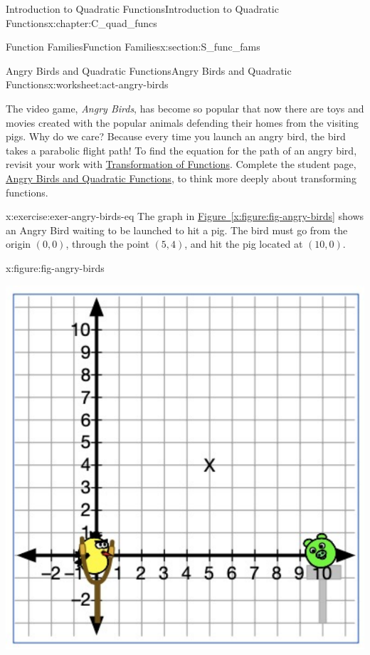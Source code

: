 \documentclass[oneside,10pt,]{book}
\newcommand{\xreffont}{\relax}
\newcommand{\pubtitle}[1]{\textsl{#1}}
\numberwithin{equation}{chapter}
\begin{document}
\begin{chapterptx}{Introduction to Quadratic Functions}{}{Introduction to Quadratic Functions}{}{}{x:chapter:C_quad_funcs}
\begin{sectionptx}{Function Families}{}{Function Families}{}{}{x:section:S_func_fams}
\begin{worksheet-subsection}{Angry Birds and Quadratic Functions}{}{Angry Birds and Quadratic Functions}{}{}{x:worksheet:act-angry-birds}
\begin{introduction}{}%
The video game, \pubtitle{Angry Birds}, has become so popular that now there are toys and movies created with the popular animals defending their homes from the visiting pigs. Why do we care? Because every time you launch an angry bird, the bird takes a parabolic flight path! To find the equation for the path of an angry bird, revisit your work with \hyperref[x:worksheet:act-trans-funcs]{Transformation of Functions}. Complete the student page, \hyperref[x:worksheet:act-angry-birds]{Angry Birds and Quadratic Functions}, to think more deeply about transforming functions.%
\end{introduction}%
\begin{divisionexercise}{1}{}{}{x:exercise:exer-angry-birds-eq}%
The graph in \hyperref[x:figure:fig-angry-birds]{Figure~{\xreffont\ref{x:figure:fig-angry-birds}}} shows an Angry Bird waiting to be launched to hit a pig. The bird must go from the origin \((0, 0)\), through the point \((5, 4)\), and hit the pig located at \((10, 0)\).%
\begin{figureptx}{}{x:figure:fig-angry-birds}{}%
\begin{image}{0.2}{0.6}{0.2}%
\includegraphics[width=\linewidth]{external/angry-birds.pdf}
\end{image}%
\tcblower
\end{figureptx}%

\end{divisionexercise}
\end{worksheet-subsection}
\end{sectionptx}
\end{chapterptx}
\end{document}
